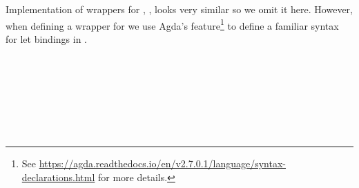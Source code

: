 Implementation of wrappers for , ,  looks very similar
so we omit it here.  However, when defining a wrapper for  we
use Agda's  feature\footnote{See
\url{https://agda.readthedocs.io/en/v2.7.0.1/language/syntax-declarations.html}
for more details.} to define a familiar syntax for let bindings in .
\begin{code}[hide]%
%
\>[2]%
\>[1665I]\AgdaSymbol{:}\AgdaSpace{}%
\AgdaSpace{}%
\AgdaSymbol{\{}\AgdaSymbol{\}}\<%
\\
\>[1665I][@{}l@{\AgdaIndent{0}}]%
\>[7]\AgdaSpace{}%
\AgdaSymbol{(}\AgdaSpace{}%
\AgdaSymbol{(}\AgdaSpace{}%
\AgdaSpace{}%
\AgdaSpace{}%
\AgdaSymbol{)}\AgdaSpace{}%
\AgdaSymbol{(}\AgdaSpace{}%
\AgdaSymbol{)}\AgdaSpace{}%
\AgdaSpace{}%
\AgdaSpace{}%
\AgdaSymbol{(}\AgdaSpace{}%
\AgdaSpace{}%
\AgdaSpace{}%
\AgdaSymbol{)}\AgdaSpace{}%
\AgdaSymbol{(}\AgdaSpace{}%
\AgdaSymbol{))}\<%
\\
%
\>[7]\AgdaSpace{}%
\AgdaSpace{}%
\AgdaSpace{}%
\AgdaSymbol{(}\AgdaSpace{}%
\AgdaSymbol{)}\<%
\\
%
\>[2]\AgdaSpace{}%
\AgdaSpace{}%
\AgdaSymbol{=}\AgdaSpace{}%
\AgdaSpace{}%
\AgdaSymbol{(}\AgdaSpace{}%
\AgdaSpace{}%
\AgdaSymbol{\{}\AgdaSymbol{\}}\AgdaSpace{}%
\AgdaSpace{}%
\AgdaSpace{}%
\AgdaSpace{}%
\AgdaSpace{}%
\AgdaSpace{}%
\AgdaSpace{}%
\AgdaSpace{}%
\AgdaSymbol{)}\<%
\\
%
\\[\AgdaEmptyExtraSkip]%
%
\>[2]%
\>[1701I]\AgdaSymbol{:}\AgdaSpace{}%
\AgdaSpace{}%
\AgdaSymbol{\{}\AgdaSymbol{\}}\<%
\\
\>[.][@{}l@{}]\<[1701I]%
\>[8]\AgdaSpace{}%
\AgdaSymbol{(}\AgdaSpace{}%
\AgdaSymbol{(}\AgdaSpace{}%

\end{code}
